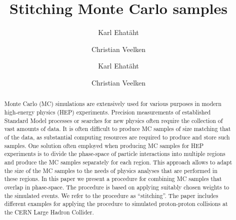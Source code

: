 \documentclass[a4paper,english,11pt]{article}
\begin{document}
\ifx\ver\verPAPER
\begin{frontmatter}
\fi

\title{Stitching Monte Carlo samples}


\ifx\ver\verPreprint
\author[1]{Karl Ehat\"aht}
\author[1]{Christian Veelken}
\fi
\ifx\ver\verPAPER
\author[tallinn]{Karl Ehat\"aht}
\author[tallinn]{Christian Veelken}
\address[tallinn]{National Institute for Chemical Physics and Biophysics, 10143 Tallinn, Estonia}
\fi

\ifx\ver\verPreprint
\maketitle
\fi

\begin{abstract}
Monte Carlo (MC) simulations are extensively used for various purposes in modern high-energy physics (HEP) experiments.
Precision measurements of established Standard Model processes or searches for new physics often require the collection of vast amounts of data.
It is often difficult to produce MC samples of size matching that of the data, as substantial computing resources are required to produce and store such samples.
One solution often employed when producing MC samples for HEP experiments 
is to divide the phase-space of particle interactions into multiple regions 
and produce the MC samples separately for each region.
This approach allows to adapt the size of the MC samples to the needs of physics analyses that are performed in these regions.
In this paper we present a procedure for combining MC samples that overlap in phase-space.
The procedure is based on applying suitably chosen weights to the simulated events.
We refer to the procedure as ``stitching''.
The paper includes different examples for applying the procedure to simulated proton-proton collisions at the CERN Large Hadron Collider.
\end{abstract}

\ifx\ver\verPAPER
\end{frontmatter}
\fi

\clearpage










\appendix


\clearpage


\end{document}
